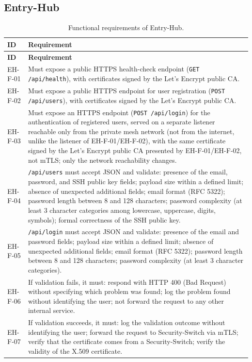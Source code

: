 \subsection{Entry-Hub}

\begin{longtable}{p{2.6cm} p{\dimexpr\linewidth-2.6cm-4\tabcolsep\relax}}
\caption{Functional requirements of Entry-Hub.} \\
\hline
\textbf{ID} & \textbf{Requirement} \\
\hline
\endfirsthead
\hline
\textbf{ID} & \textbf{Requirement} \\
\hline
\endhead
\hline
\endfoot
\hline
\endlastfoot
EH-F-01 & Must expose a public HTTPS health-check endpoint (\texttt{GET /api/health}), with certificates signed by the Let's Encrypt public CA. \\
EH-F-02 & Must expose a public HTTPS endpoint for user registration (\texttt{POST /api/users}), with certificates signed by the Let's Encrypt public CA. \\
EH-F-03 & Must expose an HTTPS endpoint (\texttt{POST /api/login}) for the authentication of registered users, served on a separate listener reachable only from the private mesh network (not from the internet, unlike the listener of EH-F-01/EH-F-02), with the same certificate signed by the Let's Encrypt public CA presented by EH-F-01/EH-F-02, not mTLS; only the network reachability changes. \\
EH-F-04 & \texttt{/api/users} must accept JSON and validate: presence of the email, password, and SSH public key fields; payload size within a defined limit; absence of unexpected additional fields; email format (RFC 5322); password length between 8 and 128 characters; password complexity (at least 3 character categories among lowercase, uppercase, digits, symbols); formal correctness of the SSH public key. \\
EH-F-05 & \texttt{/api/login} must accept JSON and validate: presence of the email and password fields; payload size within a defined limit; absence of unexpected additional fields; email format (RFC 5322); password length between 8 and 128 characters; password complexity (at least 3 character categories). \\
EH-F-06 & If validation fails, it must: respond with HTTP 400 (Bad Request) without specifying which problem was found; log the problem found without identifying the user; not forward the request to any other internal service. \\
EH-F-07 & If validation succeeds, it must: log the validation outcome without identifying the user; forward the request to Security-Switch via mTLS; verify that the certificate comes from a Security-Switch; verify the validity of the X.509 certificate. \\

\end{longtable}
